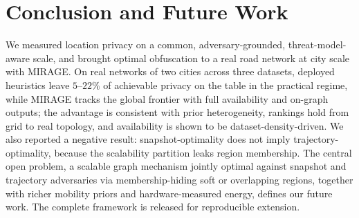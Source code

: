 \documentclass[10pt,journal,compsoc]{IEEEtran}
\begin{document}
\section{Conclusion and Future Work}
\label{sec:conclusion}
We measured location privacy on a common, adversary-grounded, threat-model-aware
scale, and brought optimal obfuscation to a real road network at city scale with
MIRAGE. On real networks of two cities across three datasets, deployed heuristics
leave $5$--$22\%$ of achievable privacy on the table in the practical regime, while
MIRAGE tracks the global frontier with full availability and on-graph outputs; the
advantage is consistent with prior heterogeneity, rankings hold from grid to real
topology, and availability is shown to be dataset-density-driven. We also reported a negative
result: snapshot-optimality does not imply trajectory-optimality, because the
scalability partition leaks region membership. The central open problem, a scalable
graph mechanism jointly optimal against snapshot and trajectory adversaries via
membership-hiding soft or overlapping regions, together with richer mobility priors
and hardware-measured energy, defines our future work. The complete framework is
released for reproducible extension.
\end{document}
